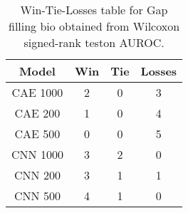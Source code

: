 \begin{table}[H]
\centering
\begin{tabular}{|c|c|c|c|}

\textbf{Model} &  \textbf{Win} &  \textbf{Tie} &  \textbf{Losses} \\
\hline

      CAE 1000 &             2 &             0 &                3 \\
\hline
       CAE 200 &             1 &             0 &                4 \\
\hline
       CAE 500 &             0 &             0 &                5 \\
\hline
      CNN 1000 &             3 &             2 &                0 \\
\hline
       CNN 200 &             3 &             1 &                1 \\
\hline
       CNN 500 &             4 &             1 &                0 \\
\hline

\end{tabular}
\caption{Win-Tie-Losses table for Gap filling bio obtained from Wilcoxon signed-rank teston AUROC.}
\label{tab:gap_filling_bio_model_comparison}
\end{table}
